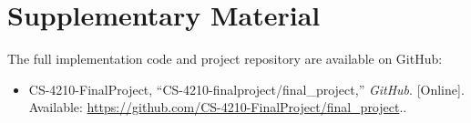 \documentclass[conference]{IEEEtran}
\begin{document}
\section*{Supplementary Material}

The full implementation code and project repository are available on GitHub: 

\begin{itemize}
    \item CS-4210-FinalProject, ``CS-4210-finalproject/final\_project,'' \textit{GitHub}. [Online]. Available: \url{https://github.com/CS-4210-FinalProject/final_project}..
\end{itemize}
\end{document}
